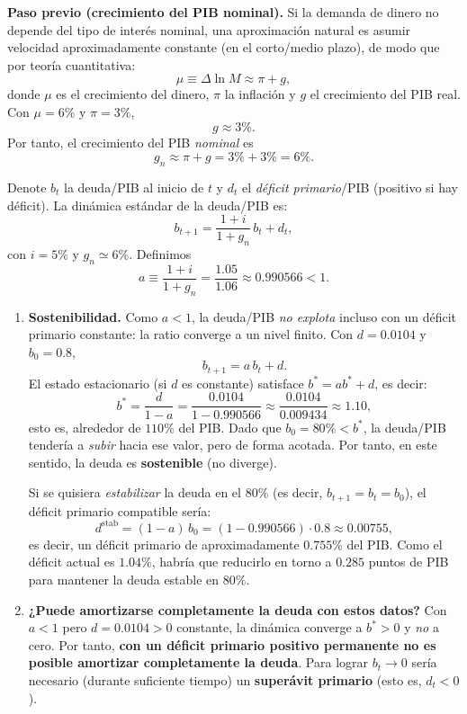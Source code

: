 \begin{solution}
\textbf{Paso previo (crecimiento del PIB nominal).}
Si la demanda de dinero no depende del tipo de interés nominal, una aproximación natural es asumir velocidad aproximadamente constante (en el corto/medio plazo), de modo que por teoría cuantitativa:
\[
\mu \equiv \Delta \ln M \approx \pi + g,
\]
donde $\mu$ es el crecimiento del dinero, $\pi$ la inflación y $g$ el crecimiento del PIB real. Con $\mu=6\%$ y $\pi=3\%$,
\[
g \approx 3\%.
\]
Por tanto, el crecimiento del PIB \emph{nominal} es
\[
g_n \approx \pi + g = 3\%+3\% = 6\%.
\]

\medskip
Denote $b_t$ la deuda/PIB al inicio de $t$ y $d_t$ el \emph{déficit primario}/PIB (positivo si hay déficit). La dinámica estándar de la deuda/PIB es:
\[
b_{t+1}=\frac{1+i}{1+g_n}\,b_t+d_t,
\]
con $i=5\%$ y $g_n\simeq 6\%$. Definimos
\[
a \equiv \frac{1+i}{1+g_n}=\frac{1.05}{1.06}\approx 0.990566<1.
\]

\begin{enumerate}[label=\Alph*)]
\item \textbf{Sostenibilidad.}
Como $a<1$, la deuda/PIB \emph{no explota} incluso con un déficit primario constante: la ratio converge a un nivel finito.
Con $d=0.0104$ y $b_0=0.8$,
\[
b_{t+1}=a\,b_t+d.
\]
El estado estacionario (si $d$ es constante) satisface $b^\ast=a b^\ast+d$, es decir:
\[
b^\ast=\frac{d}{1-a}
= \frac{0.0104}{1-0.990566}
\approx \frac{0.0104}{0.009434}
\approx 1.10,
\]
esto es, alrededor de $110\%$ del PIB. Dado que $b_0=80\%<b^\ast$, la deuda/PIB tendería a \emph{subir} hacia ese valor, pero de forma acotada. Por tanto, en este sentido, la deuda es \textbf{sostenible} (no diverge).

Si se quisiera \emph{estabilizar} la deuda en el $80\%$ (es decir, $b_{t+1}=b_t=b_0$), el déficit primario compatible sería:
\[
d^{\text{stab}}=(1-a)\,b_0 = (1-0.990566)\cdot 0.8 \approx 0.00755,
\]
es decir, un déficit primario de aproximadamente $0.755\%$ del PIB. Como el déficit actual es $1.04\%$, habría que reducirlo en torno a $0.285$ puntos de PIB para mantener la deuda estable en $80\%$.

\item \textbf{¿Puede amortizarse completamente la deuda con estos datos?}
Con $a<1$ pero $d=0.0104>0$ constante, la dinámica converge a $b^\ast>0$ y \emph{no} a cero. Por tanto, \textbf{con un déficit primario positivo permanente no es posible amortizar completamente la deuda}. Para lograr $b_t\to 0$ sería necesario (durante suficiente tiempo) un \textbf{superávit primario} (esto es, $d_t<0$).


\end{enumerate}
\end{solution}
